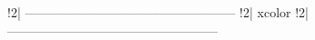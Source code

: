 !2| --------------------------------------------------
!2| {xcolor}
!2| --------------------------------------------------

\usepackage{xcolor}


